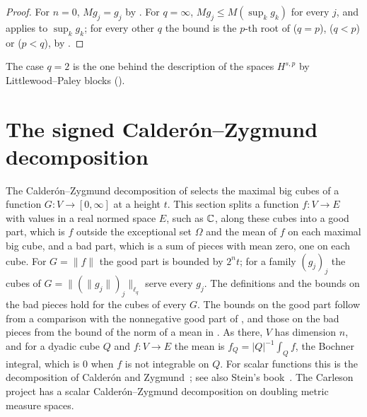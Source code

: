 \begin{proof}
\leanok
For $n = 0$, $M g_j = g_j$ by . For $q = \infty$,
$M g_j \leq M(\sup_k g_k)$ for every $j$, and  applies to
$\sup_k g_k$; for every other $q$ the bound is the $p$-th root of
 ($q = p$),  ($q < p$) or
 ($p < q$), by
.
\end{proof}

The case $q = 2$ is the one behind the description of the spaces $H^{s,p}$ by Littlewood--Paley
blocks ().

\section{The signed Calder\'on--Zygmund decomposition}
\label{sec:calderon-zygmund-signed}

The Calder\'on--Zygmund decomposition of  selects the maximal big
cubes of a function $G : V \to [0, \infty]$ at a height $t$. This section splits a function
$f : V \to E$ with values in a real normed space $E$, such as $\mathbb{C}$, along these cubes into a
good part, which is $f$ outside the exceptional set $\Omega$ and the mean of $f$ on each maximal
big cube, and a bad part, which is a sum of pieces with mean zero, one on each cube. For
$G = \|f\|$ the good part is bounded by $2^n t$; for a family $(g_j)_j$ the cubes of
$G = \|(\|g_j\|)_j\|_{\ell_q}$ serve every $g_j$. The definitions and the bounds on the bad
pieces hold for the cubes of every $G$. The bounds on the good part follow from a comparison
with the nonnegative good part of , and those on the bad
pieces from the bound of the norm of a mean in . As there,
$V$ has dimension $n$, and for a dyadic cube $Q$ and $f : V \to E$ the mean is
$f_Q = |Q|^{-1} \int_Q f$, the Bochner integral, which is $0$ when $f$ is not integrable on $Q$.
For scalar functions this is the decomposition of Calder\'on and
Zygmund~\cite{CalderonZygmund1952}; see also Stein's book~\cite{SteinSingular}. The Carleson
project
\cite{CarlesonBlueprint,CarlesonLean} has a scalar Calder\'on--Zygmund decomposition
on doubling metric measure spaces.

